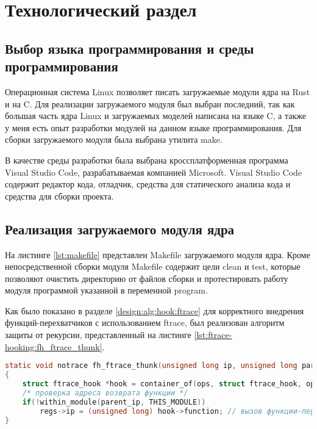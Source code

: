 \chapter{Технологический раздел}
\section{Выбор языка программирования и среды программирования}
    Операционная система Linux позволяет писать загружаемые модули ядра на Rust и на C.
    Для реализации загружаемого модуля был выбран последний, так как
    большая часть ядра Linux и загружаемых моделей написана на языке C, 
    а также у меня есть опыт разработки модулей на данном языке программирования.
    Для сборки загружаемого модуля была выбрана утилита make.

    В качестве среды разработки была выбрана 
    кроссплатформенная программа Visual Studio Code,
    разрабатываемая компанией Microsoft.
    Visual Studio Code содержит редактор кода, отладчик,
    средства для статического анализа кода и средства для сборки проекта.

\section{Реализация загружаемого модуля ядра}
    На листинге \ref{lst:makefile} представлен Makefile загружаемого модуля ядра.
    Кроме непосредственной сборки модуля Makefile содержит цели clean и test,
    которые позволяют очистить директорию от файлов сборки и протестировать работу модуля
    программой указанной в переменной program.

    Как было показано в разделе \ref{design:alg:hook:ftrace}
    для корректного внедрения функций-перехватчиков с использованием ftrace,
    был реализован алгоритм защиты от рекурсии, представленный на листинге \ref{lst:ftrace-hooking:fh_ftrace_thunk}.

    \begin{lstlisting}[language=C, label=lst:ftrace-hooking:fh_ftrace_thunk, caption=Защита ftrace от рекурсии.]
static void notrace fh_ftrace_thunk(unsigned long ip, unsigned long parent_ip, struct ftrace_ops *ops, struct pt_regs *regs)
{
    struct ftrace_hook *hook = container_of(ops, struct ftrace_hook, ops);
    /* проверка адреса возврата функции */
    if(!within_module(parent_ip, THIS_MODULE))
        regs->ip = (unsigned long) hook->function; // вызов функции-перехватчика
}
    \end{lstlisting}

